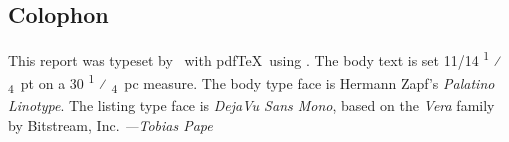 \null
\ifthispageodd{\clearpage}{}
\markboth{}{}
\null\vfill
\subsection*{Colophon}
\newcommand{\textfrac}[2]{%
  {\textsuperscript{#1}}%
  ⁄%
  {\textsubscript{#2}}%
}
{%
  This report was typeset by \LaTeXe\ with pdf\TeX\ using \KOMAScript. The body
  text is set 11/14\textfrac{1}{4}\,pt on a 30\textfrac{1}{4}\,pc measure. The
  body type face is Hermann Zapf's \emph{Palatino Linotype}. The listing type
  face is \emph{DejaVu Sans Mono}, based on the \emph{Vera} family by
  Bitstream, Inc. {\itshape\footnotesize\hfill---Tobias Pape}

}
